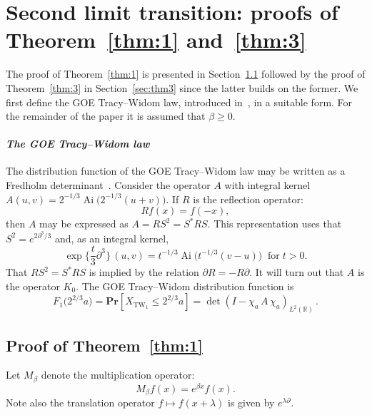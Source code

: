 \documentclass[10pt]{amsart}
\theoremstyle{definition}\newtheorem{defi}[theo]{Definition}\newtheorem{rema}[theo]{Remark}\newtheorem{exam}[theo]{Example}\newtheorem{exem}[theo]{Example}\newtheorem{nota}[theo]{Notation}
\DeclareMathOperator{\tw}{TW}
\DeclareMathOperator{\Ai}{Ai}
\newcommand{\pr}[1]{\mathbf{Pr}\left[#1\right]}
\newcommand{\R}{\mathbb{R}}
\begin{document}
\section{Second limit transition: proofs of Theorem~\ref{thm:1} and~\ref{thm:3}} \label{sec:mainthm}

The proof of Theorem~\ref{thm:1} is presented in Section~\ref{sec:thm1} followed by the proof of Theorem~\ref{thm:3} in Section~\ref{sec:thm3} since the latter builds on the former. We first define the GOE Tracy--Widom law, introduced in~\cite{TW}, in a suitable form. For the remainder of the paper it is assumed that $\beta \geq 0$.

\paragraph{\emph{The GOE Tracy--Widom law}}
The distribution function of the GOE Tracy--Widom law may be written as a Fredholm determinant~\cite{FS}. Consider the operator $A$ with integral kernel $A(u,v) = 2^{-1/3}\Ai\big(2^{-1/3}(u+v)\big)$. If $R$ is the reflection operator:
\begin{equation}\label{eqn:R}
Rf(x) = f(-x),
\end{equation}
then $A$ may be expressed as $A = R S^2 = S^{*}RS$. This representation uses that $S^2 = e^{2\partial^3/3}$ and, as an integral kernel,
\[
\exp \Big \{\frac{t}{3} \partial^3 \Big \}\,(u,v) = t^{-1/3} \Ai \big(t^{-1/3}(v-u)\big)\;\;\text{for}\; t > 0.
\]
That $RS^2 = S^{*}RS$ is implied by the relation $\partial R = - R \partial$. It will turn out that $A$ is the operator $K_{0}$. The GOE Tracy--Widom distribution function is
\begin{equation}\label{eqn:AGOE}
F_1\big(2^{2/3}a \big) = \pr{X_{\tw_1} \leq 2^{2/3} a} = \det (I - \chi_{a} \,A \, \chi_{a})_{L^2(\R)}\,.
\end{equation}

\subsection{Proof of Theorem~\ref{thm:1}} \label{sec:thm1}

Let $M_{\beta}$ denote the multiplication operator:
\[
M_{\beta}f(x) = e^{\beta x} f(x).
\]
Note also the translation operator $f \mapsto f(x+\lambda)$ is given by $e^{\lambda \partial}$.
\end{document}
